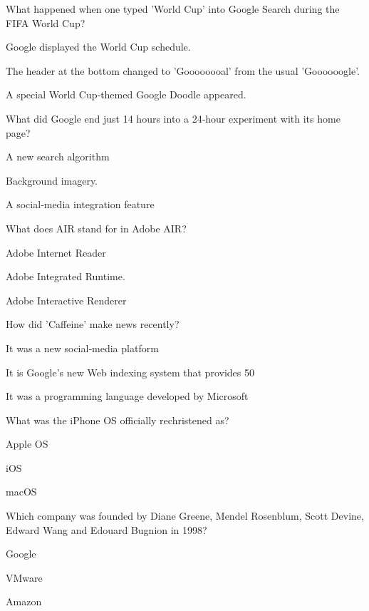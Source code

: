 
\begin{enhancedmcq}{What happened when one typed 'World Cup' into Google Search during the FIFA World Cup?}
\item Google displayed the World Cup schedule.
\item The header at the bottom changed to 'Goooooooal' from the usual 'Goooooogle'.
\item A special World Cup‑themed Google Doodle appeared.

\end{enhancedmcq}
\begin{enhancedmcq}{What did Google end just 14 hours into a 24‑hour experiment with its home page?}
\item A new search algorithm
\item Background imagery.
\item A social‑media integration feature

\end{enhancedmcq}
\begin{enhancedmcq}{What does AIR stand for in Adobe AIR?}
\item Adobe Internet Reader
\item Adobe Integrated Runtime.
\item Adobe Interactive Renderer

\end{enhancedmcq}
\begin{enhancedmcq}{How did 'Caffeine' make news recently?}
\item It was a new social‑media platform
\item It is Google's new Web indexing system that provides 50 %
\item It was a programming language developed by Microsoft

\end{enhancedmcq}
\begin{enhancedmcq}{What was the iPhone OS officially rechristened as?}
\item Apple OS
\item iOS
\item macOS

\end{enhancedmcq}
\begin{enhancedmcq}{Which company was founded by Diane Greene, Mendel Rosenblum, Scott Devine, Edward Wang and Edouard Bugnion in 1998?}
\item Google
\item VMware
\item Amazon

\end{enhancedmcq}
